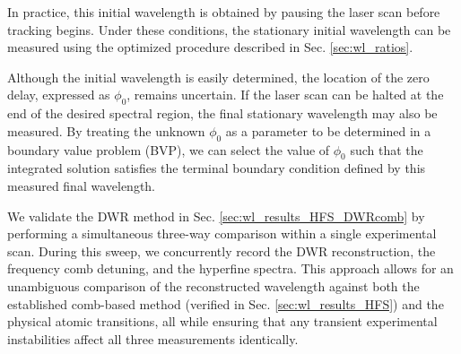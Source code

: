 \documentclass[12pt]{report}
\begin{document}
	In practice, this initial wavelength is obtained by pausing the laser scan before tracking begins. Under these conditions, the stationary initial wavelength can be measured using the optimized procedure described in Sec. \ref{sec:wl_ratios}.
	
	Although the initial wavelength is easily determined, the location of the zero delay, expressed as $\phi_0$, remains uncertain. If the laser scan can be halted at the end of the desired spectral region, the final stationary wavelength may also be measured. By treating the unknown $\phi_0$ as a parameter to be determined in a boundary value problem (BVP), we can select the value of $\phi_0$ such that the integrated solution satisfies the terminal boundary condition defined by this measured final wavelength.
	
	We validate the DWR method in Sec. \ref{sec:wl_results_HFS_DWRcomb} by performing a simultaneous three-way comparison within a single experimental scan. During this sweep, we concurrently record the DWR reconstruction, the frequency comb detuning, and the hyperfine spectra. This approach allows for an unambiguous comparison of the reconstructed wavelength against both the established comb-based method (verified in Sec. \ref{sec:wl_results_HFS}) and the physical atomic transitions, all while ensuring that any transient experimental instabilities affect all three measurements identically.
	
\end{document}
